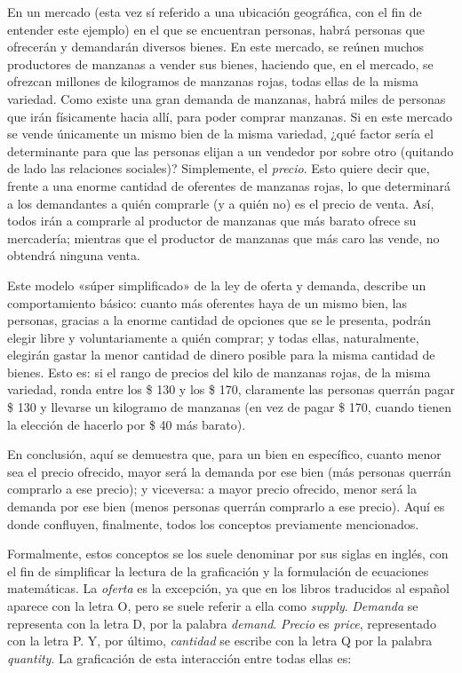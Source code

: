 \documentclass[12pt,a4paper,twoside]{book}
\begin{document}
En un mercado (esta vez sí referido a una ubicación geográfica, con el fin de entender este ejemplo) en el que se encuentran personas, habrá personas que ofrecerán y demandarán diversos bienes. En este mercado, se reúnen muchos productores de manzanas a vender sus bienes, haciendo que, en el mercado, se ofrezcan millones de kilogramos de manzanas rojas, todas ellas de la misma variedad. Como existe una gran demanda de manzanas, habrá miles de personas que irán físicamente hacia allí, para poder comprar manzanas. Si en este mercado se vende únicamente un mismo bien de la misma variedad, ¿qué factor sería el determinante para que las personas elijan a un vendedor por sobre otro (quitando de lado las relaciones sociales)? Simplemente, el \textit{precio}. Esto quiere decir que, frente a una enorme cantidad de oferentes de manzanas rojas, lo que determinará a los demandantes a quién comprarle (y a quién no) es el precio de venta. Así, todos irán a comprarle al productor de manzanas que más barato ofrece su mercadería; mientras que el productor de manzanas que más caro las vende, no obtendrá ninguna venta.

Este modelo «súper simplificado» de la ley de oferta y demanda, describe un comportamiento básico: cuanto más oferentes haya de un mismo bien, las personas, gracias a la enorme cantidad de opciones que se le presenta, podrán elegir libre y voluntariamente a quién comprar; y todas ellas, naturalmente, elegirán gastar la menor cantidad de dinero posible para la misma cantidad de bienes. Esto es: si el rango de precios del kilo de manzanas rojas, de la misma variedad, ronda entre los \$ 130 y los \$ 170, claramente las personas querrán pagar \$ 130 y llevarse un kilogramo de manzanas (en vez de pagar \$ 170, cuando tienen la elección de hacerlo por \$ 40 más barato).

En conclusión, aquí se demuestra que, para un bien en específico, cuanto menor sea el precio ofrecido, mayor será la demanda por ese bien (más personas querrán comprarlo a ese precio); y viceversa: a mayor precio ofrecido, menor será la demanda por ese bien (menos personas querrán comprarlo a ese precio). Aquí es donde confluyen, finalmente, todos los conceptos previamente mencionados.

Formalmente, estos conceptos se los suele denominar por sus siglas en inglés, con el fin de simplificar la lectura de la graficación y la formulación de ecuaciones matemáticas. La \textit{oferta} es la excepción, ya que en los libros traducidos al español aparece con la letra O, pero se suele referir a ella como \textit{supply}. \textit{Demanda} se representa con la letra D, por la palabra \textit{demand}. \textit{Precio} es \textit{price}, representado con la letra P. Y, por último, \textit{cantidad} se escribe con la letra Q por la palabra \textit{quantity}. La graficación de esta interacción entre todas ellas es:
\end{document}
